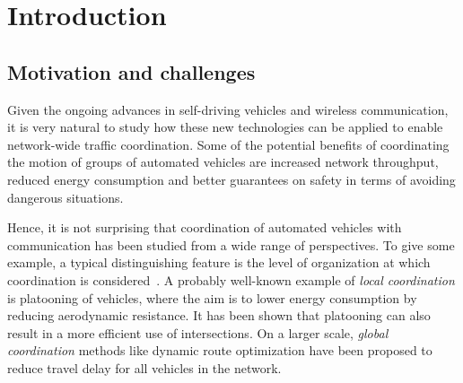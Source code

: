 \documentclass[a4paper]{report}
\theoremstyle{definition}
\theoremstyle{plain}
\begin{document}
\makeatletter
\renewcommand{\toclevel@part}{100}
\makeatother


\newpage
\tableofcontents







\chapter{Introduction}

\section{Motivation and challenges}


%
Given the ongoing advances in self-driving vehicles and wireless communication,
it is very natural to study how these new technologies can be applied to enable
network-wide traffic coordination.
%
Some of the potential benefits of coordinating the motion of groups of automated
vehicles are increased network throughput, reduced energy consumption and better
guarantees on safety in terms of avoiding dangerous situations.

%
Hence, it is not surprising that coordination of automated vehicles with
communication has been studied from a wide range of perspectives.
%
To give some example, a typical distinguishing feature is the level of
organization at which coordination is considered~\cite{marianiCoordinationAutonomousVehicles2022}. A probably well-known
example of \emph{local coordination} is platooning of vehicles, where the aim is to
lower energy consumption by reducing aerodynamic resistance. It has been shown
that platooning can also result in a more efficient use of intersections. On a
larger scale, \emph{global coordination} methods like dynamic route optimization have
been proposed to reduce travel delay for all vehicles in the network.
\end{document}
